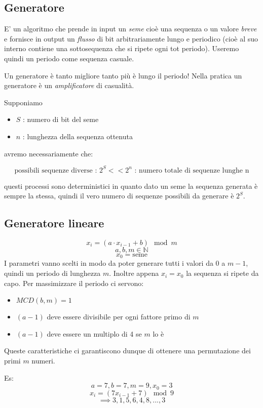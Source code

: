 \subsection{Generatore}
E' un algoritmo che prende in input un \emph{seme} cioè una sequenza o un valore \emph{breve} e fornisce in output un \emph{flusso} di bit arbitrariamente lungo e periodico (cioè al suo interno contiene una sottosequenza che si ripete ogni tot periodo). Useremo quindi un periodo come sequenza casuale.

Un generatore è tanto migliore tanto più è lungo il periodo! Nella pratica un generatore è un \emph{amplificatore} di casualità.

Supponiamo 
\begin{itemize}
    \item $S$ : numero di bit del seme
    \item $n$ : lunghezza della sequenza ottenuta
\end{itemize}
avremo necessariamente che:

$$ \text{possibili sequenze diverse : } 2^{S} << 2^{n} \text{ : numero totale di sequenze lunghe n}$$

questi processi sono deterministici in quanto dato un seme la sequenza generata è sempre la stessa, quindi il vero numero di sequenze possibili da generare è $2^{S}$.

\subsection{Generatore lineare}
$$ x_{i} = \left( a \cdot x_{i-1} + b \right) \mod m $$
$$ a,b,m \in \mathbb{N} $$
$$ x_{0} = \text{seme} $$
I parametri vanno scelti in modo da poter generare tutti i valori da $0$ a $m-1$, quindi un periodo di lunghezza $m$. Inoltre appena $x_{i} = x_{0}$ la sequenza si ripete da capo. Per massimizzare il periodo ci servono:
\begin{itemize}
    \item $MCD(b, m) = 1$
    \item $(a-1)$ deve essere divisibile per ogni fattore primo di $m$
    \item $(a-1)$ deve essere un multiplo di 4 se $m$ lo è
\end{itemize}
Queste caratteristiche ci garantiscono dunque di ottenere una permutazione dei primi $m$ numeri.

Es:
$$ a=7, b=7, m=9, x_{0}=3 $$
$$ x_i = (7x_{i-1} + 7) \mod 9 $$
$$ \implies 3, 1, 5, 6, 4, 8, ... , 3 $$

